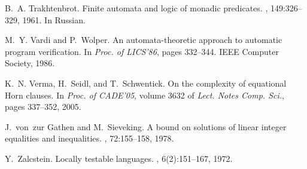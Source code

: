 \documentclass{LMCS}
\theoremstyle{plain}
\begin{document}
\begin{thebibliography}{10}
B.~A. Trakhtenbrot.
\newblock Finite automata and logic of monadic predicates.
, 149:326--329, 1961.
\newblock In Russian.

M.~Y. Vardi and P.~Wolper.
\newblock An automata-theoretic approach to automatic program verification.
\newblock In {\em Proc. of LICS'86}, pages 332--344. IEEE Computer Society,
  1986.

K.~N. Verma, H.~Seidl, and T.~Schwentick.
\newblock On the complexity of equational {H}orn clauses.
\newblock In {\em Proc. of CADE'05}, volume 3632 of {\em Lect. Notes Comp.
  Sci.}, pages 337--352, 2005.

J.~von~zur Gathen and M.~Sieveking.
\newblock A bound on solutions of linear integer equalities and inequalities.
, 72:155--158, 1978.

Y.~Zalcstein.
\newblock Locally testable languages.
, 6(2):151--167, 1972.

\end{thebibliography}
\end{document}
